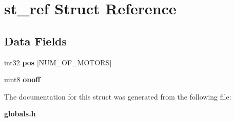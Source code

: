 \section{st\+\_\+ref Struct Reference}
\label{structst__ref}
\subsection*{Data Fields}
\begin{DoxyCompactItemize}
\item 
\mbox{\label{structst__ref_a4ac6e991f146f79c274e21a17cfff0a0}} 
int32 {\bfseries pos} [N\+U\+M\+\_\+\+O\+F\+\_\+\+M\+O\+T\+O\+RS]
\item 
\mbox{\label{structst__ref_aea636dc117fd774b0cbfc5e936eac3e5}} 
uint8 {\bfseries onoff}
\end{DoxyCompactItemize}


The documentation for this struct was generated from the following file\+:\begin{DoxyCompactItemize}
\item 
\textbf{ globals.\+h}\end{DoxyCompactItemize}
